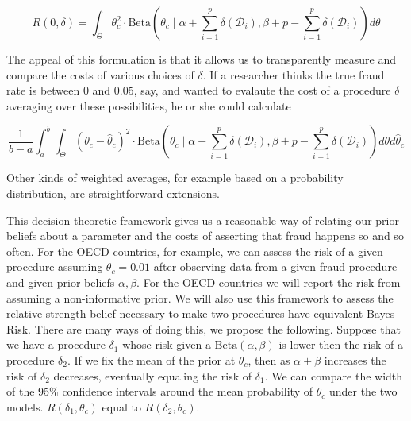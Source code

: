 $$R(0,\delta) = \int_\Theta  \theta_c^2 \cdot \textrm{Beta}\left(\theta_c \mid \alpha+\sum_{i=1}^p \delta(\mathcal{D}_i),\beta+p-\sum_{i=1}^p \delta(\mathcal{D}_i) \right) d\theta  $$

The appeal of this formulation is that it allows us to transparently measure and compare the costs of various choices of $\delta$.  If a researcher thinks the true fraud rate is between 0 and $0.05$, say, and wanted to evalaute the cost of a procedure $\delta$ averaging over these possibilities, he or she could calculate 

$$\frac{1}{b-a} \int_a^b \int_\Theta \left(\theta_c - \hat{\theta}_c \right)^2 \cdot \textrm{Beta}\left(\theta_c \mid \alpha+\sum_{i=1}^p \delta(\mathcal{D}_i),\beta+p-\sum_{i=1}^p \delta(\mathcal{D}_i) \right) d\theta d\hat{\theta}_c$$

Other kinds of weighted averages, for example based on a probability distribution, are straightforward extensions. 

This decision-theoretic framework gives us a reasonable way of relating our prior beliefs about a parameter and the costs of asserting that fraud happens so and so often.  For the OECD countries, for example, we can assess the risk of a given procedure assuming $\theta_c = 0.01$ after observing data from a given fraud procedure and given prior beliefs $\alpha,\beta$.  For the OECD countries we will report the risk from assuming a non-informative prior. We will also use this framework to assess the relative strength belief necessary to make two procedures have equivalent Bayes Risk.  There are many ways of doing this, we propose the following. Suppose that we have a procedure $\delta_1$ whose risk given a $\textrm{Beta}(\alpha,\beta)$ is lower then the risk of a procedure $\delta_2$.  If we fix the mean of the prior at $\theta_c$, then as $\alpha+\beta$ increases the risk of $\delta_2$ decreases, eventually equaling the risk of $\delta_1$.  We can compare the width of the 95\% confidence intervals around the mean  probability of $\theta_c$ under the two models. $R(\delta_1,\theta_c)$ equal to $R(\delta_2,\theta_c)$.  
